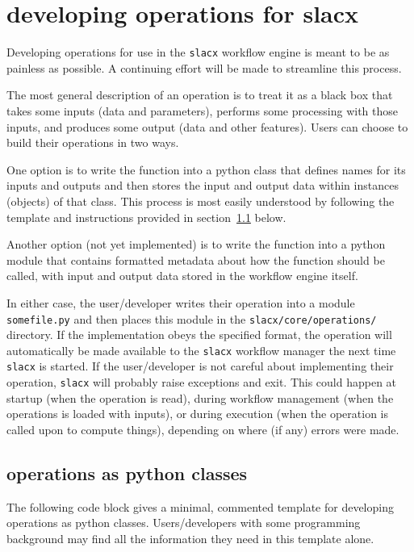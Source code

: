 \section{developing operations for slacx}
\label{sec:op_dev}

Developing operations for use in the \verb|slacx| workflow engine 
is meant to be as painless as possible.
A continuing effort will be made to streamline this process.

The most general description of an operation 
is to treat it as a black box that takes some inputs (data and parameters),
performs some processing with those inputs,
and produces some output (data and other features).
Users can choose to build their operations in two ways.

One option is to write the function into a python class
that defines names for its inputs and outputs
and then stores the input and output data 
within instances (objects) of that class.
This process is most easily understood 
by following the template and instructions 
provided in section~\ref{sec:op_dev_by_class} below.

Another option (not yet implemented)
is to write the function into a python module 
that contains formatted metadata 
about how the function should be called,
with input and output data 
stored in the workflow engine itself.

In either case, the user/developer writes their operation 
into a module \verb|somefile.py|
and then places this module in the \verb|slacx/core/operations/| directory.
If the implementation obeys the specified format, 
the operation will automatically be made available 
to the \verb|slacx| workflow manager
the next time \verb|slacx| is started.
If the user/developer is not careful 
about implementing their operation,
\verb|slacx| will probably raise exceptions and exit. 
This could happen at startup (when the operation is read),
during workflow management (when the operations is loaded with inputs),
or during execution (when the operation is called upon to compute things),
depending on where (if any) errors were made.


\subsection{operations as python classes}
\label{sec:op_dev_by_class}

The following code block gives a minimal, 
commented template for developing
operations as python classes.
Users/developers with some programming background
may find all the information they need in this template alone.

